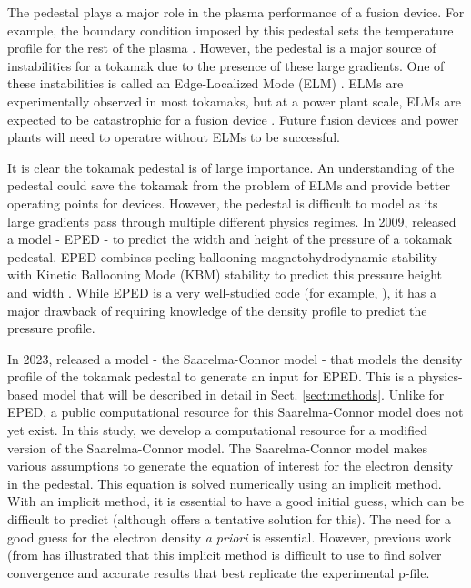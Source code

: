 \documentclass[twocolumn,secnumarabic,amssymb, nobibnotes, aps, prd]{revtex4-2}
\begin{document}
The pedestal plays a major role in the plasma performance of a fusion device. 
For example, the boundary condition imposed by this pedestal sets the temperature profile for the rest of the plasma \cite{saarelma2023testing}.
However, the pedestal is a major source of instabilities for a tokamak due to the presence of these large gradients. 
One of these instabilities is called an Edge-Localized Mode (ELM) \cite{snyder2011first}. 
ELMs are experimentally observed in most tokamaks, but at a power plant scale, ELMs are expected to be catastrophic for a fusion device \cite{liang2011overview}. 
Future fusion devices and power plants will need to operatre without ELMs to be successful.

It is clear the tokamak pedestal is of large importance. 
An understanding of the pedestal could save the tokamak from the problem of ELMs and provide better operating points for devices.
However, the pedestal is difficult to model as its large gradients pass through multiple different physics regimes.
In 2009, \cite{snyder2009development} released a model - EPED - to predict the width and height of the pressure of a tokamak pedestal.
EPED combines peeling-ballooning magnetohydrodynamic stability with Kinetic Ballooning Mode (KBM) stability to predict this pressure height and width \cite{snyder2009development}.
While EPED is a very well-studied code (for example, \cite{snyder2011first}), it has a major drawback of requiring knowledge of the density profile to predict the pressure profile.

In 2023, \cite{saarelma2023testing} released a model - the Saarelma-Connor model - that models the density profile of the tokamak pedestal to generate an input for EPED.
This is a physics-based model that will be described in detail in Sect. \ref{sect:methods}.
Unlike for EPED, a public computational resource for this Saarelma-Connor model does not yet exist.
In this study, we develop a computational resource for a modified version of the Saarelma-Connor model.
The Saarelma-Connor model makes various assumptions to generate the equation of interest for the electron density in the pedestal.
This equation is solved numerically using an implicit method.
With an implicit method, it is essential to have a good initial guess, which can be difficult to predict (although \cite{saarelma2023testing} offers a tentative solution for this).
The need for a good guess for the electron density \textit{a priori} is essential. 
However, previous work (from \cite{JohnLabbate} has illustrated that this implicit method is difficult to use to find solver convergence and accurate results that best replicate the experimental p-file.
\end{document}
